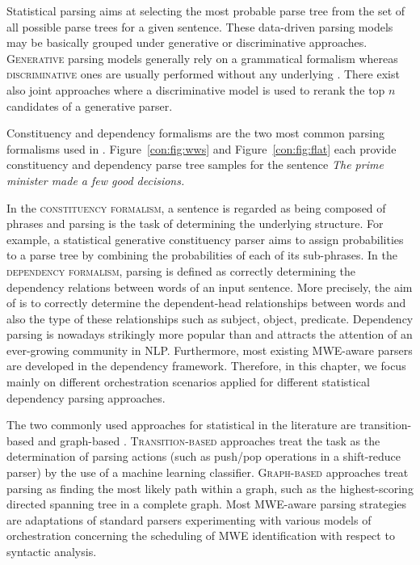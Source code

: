 \documentclass[output=paper]{langsci/langscibook}
\begin{document}
Statistical parsing aims at selecting the most probable parse tree from the set of all possible parse trees for a given sentence. 
These data-driven parsing models may be basically grouped under generative or discriminative approaches.
\textsc{Generative} parsing models generally rely on a grammatical formalism whereas \textsc{discriminative} ones are usually performed without any underlying .
There exist also joint approaches where a discriminative model is used to rerank the top $n$ candidates of a generative parser.

Constituency and dependency formalisms are the two most common parsing formalisms used in .
Figure~\ref{con:fig:wws} and Figure~\ref{con:fig:flat} each provide constituency and dependency parse tree samples
for the sentence \textit{The prime minister made a few good decisions.} 

In the \textsc{constituency formalism}, a sentence is regarded as being composed of phrases and parsing is the task of determining the underlying  structure.
For example, a statistical generative constituency parser aims to assign probabilities to a parse tree by combining the probabilities of each of its sub-phrases.
In the \textsc{dependency formalism}, parsing is defined as correctly determining the dependency relations between words of an input sentence. More precisely,
the aim of  is to correctly determine the dependent-head relationships between words and also the type of these relationships such as subject, object, predicate.
Dependency parsing is nowadays strikingly more popular than  and attracts the attention of an ever-growing community in NLP.
Furthermore, most existing MWE-aware parsers are developed in the dependency framework.
Therefore, in this chapter, we focus mainly on different orchestration scenarios applied for different statistical dependency parsing approaches.


The two commonly used approaches for statistical  in the literature are transition-based \citep{yamada2003statistical,nivre2007maltparser} and graph-based \citep{eisner1996three,mcdonald-lerman-pereira:2006:conll-x,nakagawa:2007:emnlp-conll2007}. 
\textsc{Transition-based} approaches treat the  task as the determination of parsing actions (such as push\slash pop operations in a shift-reduce parser) by the use of a machine learning classifier. \textsc{Graph-based} approaches treat parsing as finding the most likely path within a graph, such as the highest-scoring directed spanning tree in a complete graph. Most MWE-aware parsing strategies are adaptations of standard parsers experimenting with various models of orchestration concerning the scheduling of MWE identification with respect to syntactic analysis.
\end{document}
